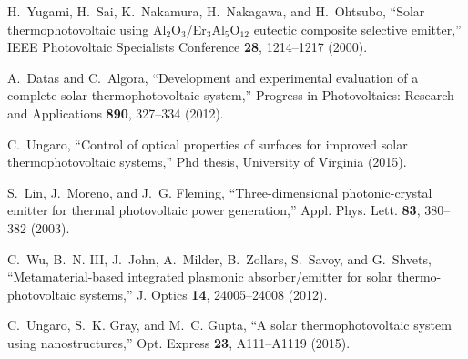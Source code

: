\documentclass[10pt,letterpaper]{article}
\begin{document}
\begin{thebibliography}{100}
H.~Yugami, H.~Sai, K.~Nakamura, H.~Nakagawa, and H.~Ohtsubo, \enquote{Solar
  thermophotovoltaic using {A}l$_2${O}$_3$/{E}r$_3${A}l$_5${O}$_{12}$ eutectic
  composite selective emitter,} IEEE Photovoltaic Specialists Conference
  \textbf{28}, 1214--1217 (2000).

A.~Datas and C.~Algora, \enquote{Development and experimental evaluation of a
  complete solar thermophotovoltaic system,} Progress in Photovoltaics:
  Research and Applications \textbf{890}, 327--334 (2012).

C.~Ungaro, \enquote{{Control of optical properties of surfaces for improved
  solar thermophotovoltaic systems},} Phd thesis, University of Virginia
  (2015).

S.~Lin, J.~Moreno, and J.~G. Fleming, \enquote{{Three-dimensional
  photonic-crystal emitter for thermal photovoltaic power generation},} Appl.
  Phys. Lett. \textbf{83}, 380--382 (2003).

C.~Wu, B.~N. III, J.~John, A.~Milder, B.~Zollars, S.~Savoy, and G.~Shvets,
  \enquote{Metamaterial-based integrated plasmonic absorber/emitter for solar
  thermo-photovoltaic systems,} J. Optics \textbf{14}, 24005--24008 (2012).

C.~Ungaro, S.~K. Gray, and M.~C. Gupta, \enquote{A solar thermophotovoltaic
  system using nanostructures,} Opt. Express \textbf{23}, A111--A1119 (2015).

\end{thebibliography}
 
\end{document}
